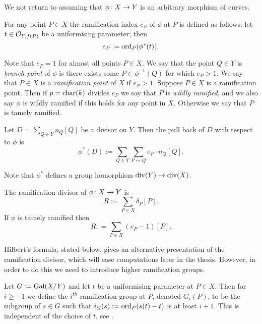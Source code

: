 We not return to assuming that $\phi \colon X \rightarrow Y$ is an arbitrary morphism of curves.

    \begin{defn}
    For any point $P \in X$ the ramification index $e_P$ of $\phi$ at $P$ is defined as follows: let $t \in {\cal O}_{Y,f(P)}$ be a uniformising parameter; then 
        \[
        e_P := \operatorname{ord}_P(\phi^*(t)).
        \]
    \end{defn}

Note that $e_P =1$ for almost all points $P \in X$.
We say that the point $Q \in Y$ is \emph{branch point} of $\phi$ is there exists some $P \in \phi^{-1}(Q)$ for which $e_P >1$.
We say that $P \in X$ is a \emph{ramification point} of $X$ if $e_P >1$.
Suppose $P \in X$ is a ramification point.
Then if $p = \operatorname{char}(k)$ divides $e_P$ we say that $P$ is \emph{wildly ramified}, and we also say $\phi$ is wildly ramified if this holds for any point in $X$.
Otherwise we say that $P$ is tamely ramified.

    \begin{defn}
    Let $D = \sum_{Q \in Y}n_Q [Q]$ be a divisor on $Y$.
    Then the pull back of $D$ with respect to $\phi$ is
        \[
        \phi^*(D) := \sum_{Q \in Y} \sum_{P \mapsto Q} e_P \cdot n_Q [Q].
        \]
    \end{defn}

Note that $\phi^*$ defines a group homorphism $\operatorname{div}(Y) \rightarrow \operatorname{div}(X)$.

    \begin{defn}
    The ramification divisor of $\phi \colon X \rightarrow Y$ is 
        \[
        R:= \sum_{P \in X} \delta_P [P].
        \]
    If $\phi$ is tamely ramified then 
        \[
        R: = \sum_{P \in X} (e_P - 1)[P].
        \]
    \end{defn}

Hilbert's formula, stated below, gives an alternative presentation of the ramification divisor, which will ease computations later in the thesis.
However, in order to do this we need to introduce higher ramification groups.

   \begin{defn}
    Let $G:=\operatorname{Gal}(X/Y)$ and let $t$ be a uniformising parameter at $P\in X$.
    Then for $i\geq -1$ we define the $i^{th}$ ramification group at $P$, denoted $G_i(P)$, to be the subgroup of $s\in G$ such that $i_G(s) := \operatorname{ord}_P(s(t)-t)$ is at least $i+1$.
    This is	independent of the choice of $t$, see \cite[Chap. IV, \S 1, pg. 62]{localfields}.
    \end{defn}

